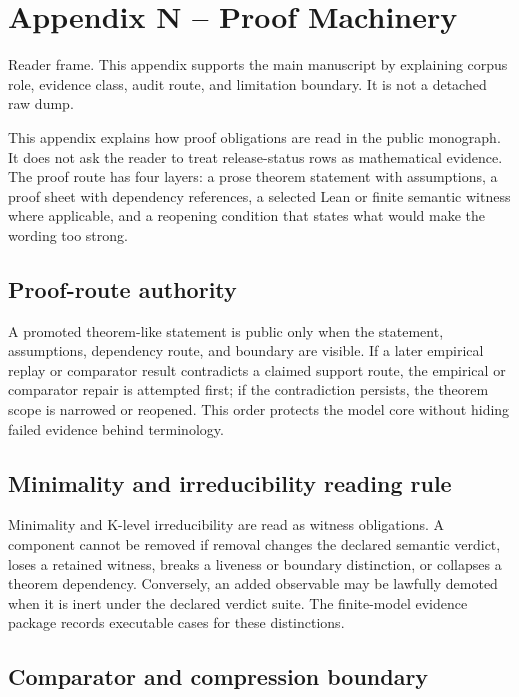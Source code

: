 \section{Appendix N -- Proof Machinery}
Reader frame. This appendix supports the main manuscript by explaining corpus role, evidence class, audit route, and limitation boundary. It is not a detached raw dump.


\label{sec:oc13-proof-machinery-appendix}

This appendix explains how proof obligations are read in the public monograph. It does not ask the reader to treat release-status rows as mathematical evidence. The proof route has four layers: a prose theorem statement with assumptions, a proof sheet with dependency references, a selected Lean or finite semantic witness where applicable, and a reopening condition that states what would make the wording too strong.


\subsection{Proof-route authority}

A promoted theorem-like statement is public only when the statement, assumptions, dependency route, and boundary are visible. If a later empirical replay or comparator result contradicts a claimed support route, the empirical or comparator repair is attempted first; if the contradiction persists, the theorem scope is narrowed or reopened. This order protects the model core without hiding failed evidence behind terminology.


\subsection{Minimality and irreducibility reading rule}

Minimality and K-level irreducibility are read as witness obligations. A component cannot be removed if removal changes the declared semantic verdict, loses a retained witness, breaks a liveness or boundary distinction, or collapses a theorem dependency. Conversely, an added observable may be lawfully demoted when it is inert under the declared verdict suite. The finite-model evidence package records executable cases for these distinctions.


\subsection{Comparator and compression boundary}

